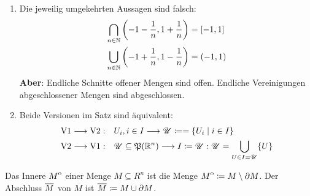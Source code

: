 \begin{bem}
    \begin{enumerate}
        \item Die jeweilig umgekehrten Aussagen sind falsch:
        \begin{align*}
            \bigcap_{n\in\mathbb{N}} \left(-1-\frac{1}{n},1+\frac{1}{n}\right) &= [-1,1]\\
            \bigcup_{n\in\mathbb{N}} \left(-1+\frac{1}{n},1-\frac{1}{n}\right) &= (-1,1)
        \end{align*}
        \textbf{Aber}: Endliche Schnitte offener Mengen sind offen. Endliche Vereinigungen abgeschlossener Mengen sind abgeschlossen.
        \item Beide Versionen im Satz sind äquivalent:
        \begin{align*}
            \mathrm{V1} \longrightarrow \mathrm{V2}:\quad& U_i, i\in I \longrightarrow \mathscr{U} \coloneqq = \{U_i \mid i\in I\}\\
            \mathrm{V2} \longrightarrow \mathrm{V1}:\quad& \mathscr{U}\subseteq \mathfrak{P}(\mathbb{R}^n) \longrightarrow I \coloneqq \mathscr{U}: \mathscr{U} = \bigcup_{U\in I=\mathscr{U}}\{U\}
        \end{align*}
    \end{enumerate}
\end{bem}
\begin{defn}
    Das Innere ${\kern0ptM}^{\mathrm{o}}$ einer Menge $M\subseteq R^n$ ist die Menge ${\kern0ptM}^{\mathrm{o}} \coloneqq M \setminus \partial M$. Der Abschluss ${\overline{\kern0ptM}}$ von $M$ ist ${\overline{\kern0ptM}}\coloneqq M\cup \partial M$.
\end{defn}